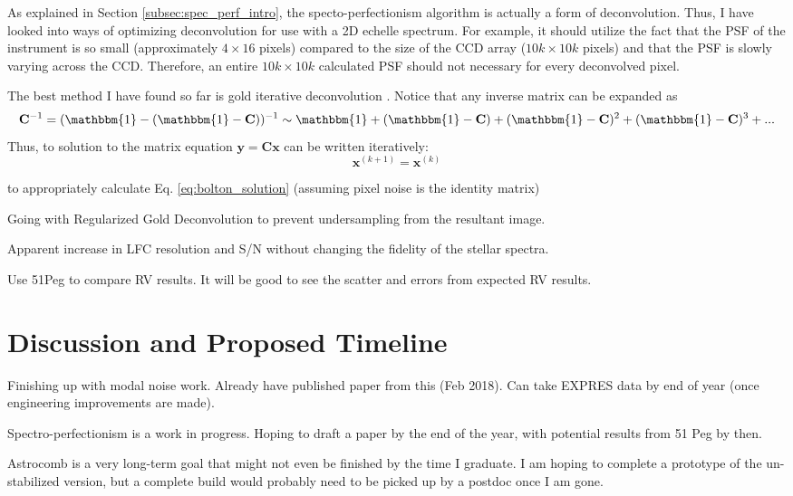 \documentclass[11pt]{article}
\begin{document}
As explained in Section \ref{subsec:spec_perf_intro}, the specto-perfectionism algorithm is actually a form of deconvolution. Thus, I have looked into ways of optimizing deconvolution for use with a 2D echelle spectrum. For example, it should utilize the fact that the PSF of the instrument is so small (approximately $4 \times 16$ pixels) compared to the size of the CCD array ($10k \times 10k$ pixels) and that the PSF is slowly varying across the CCD. Therefore, an entire $10k \times 10k$ calculated PSF should not necessary for every deconvolved pixel.

The best method I have found so far is gold iterative deconvolution \citep{Morhac2003}. Notice that any inverse matrix can be expanded as
\begin{equation}
    \mathbf{C}^{-1} = (\mathbbm{1}-(\mathbbm{1}-\mathbf{C}))^{-1} \sim \mathbbm{1} + (\mathbbm{1}-\mathbf{C}) + (\mathbbm{1}-\mathbf{C})^2 + (\mathbbm{1}-\mathbf{C})^3 + ...
    \label{eq:inverse_expansion}
\end{equation}
Thus, to solution to the matrix equation $\mathbf{y} = \mathbf{C} \mathbf{x}$ can be written iteratively:
\begin{equation}
    \mathbf{x}^{(k+1)} = \mathbf{x}^{(k)}
\end{equation}

to appropriately calculate Eq. \ref{eq:bolton_solution} (assuming pixel noise is the identity matrix)


Going with Regularized Gold Deconvolution to prevent undersampling from the resultant image.

Apparent increase in LFC resolution and S/N without changing the fidelity of the stellar spectra.

Use 51Peg to compare RV results. It will be good to see the scatter and errors from expected RV results.

\section{Discussion and Proposed Timeline}

Finishing up with modal noise work. Already have published paper from this (Feb 2018). Can take EXPRES data by end of year (once engineering improvements are made).

Spectro-perfectionism is a work in progress. Hoping to draft a paper by the end of the year, with potential results from 51 Peg by then.

Astrocomb is a very long-term goal that might not even be finished by the time I graduate. I am hoping to complete a prototype of the un-stabilized version, but a complete build would probably need to be picked up by a postdoc once I am gone.



\pagebreak



\end{document}
